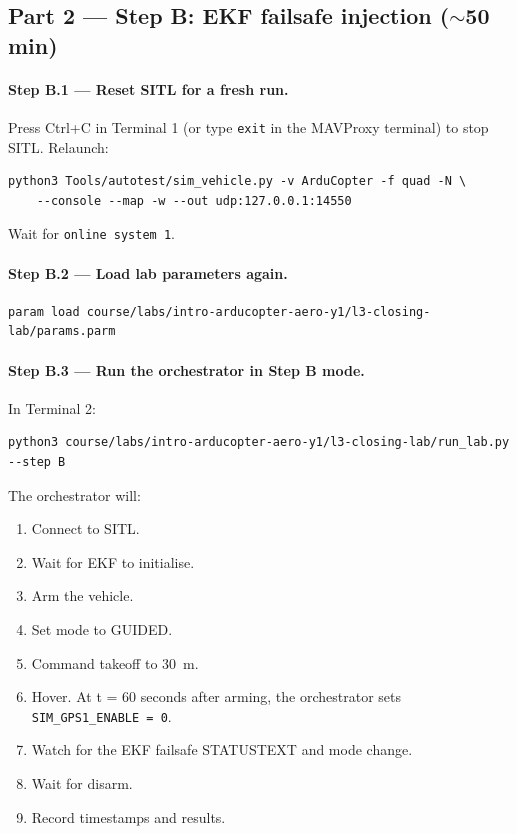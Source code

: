 \documentclass[a4paper,11pt,twoside]{article}
\begin{document}
\subsection*{Part 2 --- Step B: EKF failsafe injection ($\sim$50 min)}

\paragraph{Step B.1 --- Reset SITL for a fresh run.}
Press Ctrl+C in Terminal 1 (or type \texttt{exit} in the MAVProxy terminal) to stop SITL. Relaunch:

\begin{Verbatim}[frame=single,fontsize=\small]
python3 Tools/autotest/sim_vehicle.py -v ArduCopter -f quad -N \
    --console --map -w --out udp:127.0.0.1:14550
\end{Verbatim}

Wait for \texttt{online system 1}.

\paragraph{Step B.2 --- Load lab parameters again.}
\begin{Verbatim}[frame=single,fontsize=\small]
param load course/labs/intro-arducopter-aero-y1/l3-closing-lab/params.parm
\end{Verbatim}

\paragraph{Step B.3 --- Run the orchestrator in Step B mode.}
In Terminal 2:

\begin{Verbatim}[frame=single,fontsize=\small]
python3 course/labs/intro-arducopter-aero-y1/l3-closing-lab/run_lab.py --step B
\end{Verbatim}

The orchestrator will:
\begin{enumerate}
  \item Connect to SITL.
  \item Wait for EKF to initialise.
  \item Arm the vehicle.
  \item Set mode to GUIDED.
  \item Command takeoff to 30~m.
  \item Hover. At t = 60 seconds after arming, the orchestrator sets \texttt{SIM\_GPS1\_ENABLE = 0}.
  \item Watch for the EKF failsafe STATUSTEXT and mode change.
  \item Wait for disarm.
  \item Record timestamps and results.
\end{enumerate}
\end{document}
